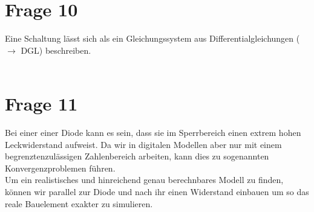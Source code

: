 \documentclass[a4paper]{scrartcl}
\begin{document}
\section*{Frage 10}
Eine Schaltung lässt sich als ein Gleichungssystem aus Differentialgleichungen ($\rightarrow$ DGL) beschreiben.
~\\
~\\


\section*{Frage 11}
Bei einer einer Diode kann es sein, dass sie im Sperrbereich einen extrem hohen Leckwiderstand aufweist. Da wir in digitalen Modellen aber nur mit einem begrenztenzulässigen Zahlenbereich arbeiten, kann dies zu sogenannten Konvergenzproblemen führen.\\
Um ein realistisches und hinreichend genau berechnbares Modell zu finden, können wir parallel zur Diode und nach ihr einen Widerstand einbauen um so das reale Bauelement exakter zu simulieren.
~\\
~\\
\end{document}

